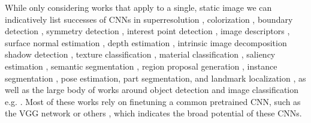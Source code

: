 \documentclass[10pt,twocolumn,letterpaper]{article}
\begin{document}
While only considering works that apply to a single, static image  we can indicatively list successes of CNNs in superresolution \cite{DongLHT16},  colorization \cite{LarssonMS16}, boundary detection \cite{shi15,ganin2014n,hed,iclr16},  symmetry detection \cite{ShenZJWZB16}, interest point detection \cite{eccv16lift}, image descriptors \cite{ZagoruykoK15,simo2015deepdesc,HanLJSB15}, 
surface normal estimation \cite{Eigen15,WangFG15,BansalRG16}, depth estimation \cite{Eigen15,LiuSL14,LiuSLR15}, intrinsic image decomposition \cite{NMY:ICCV:2015} shadow detection \cite{yago16},  texture classification \cite{CimpoiMKV16}, material classification \cite{BellUSB15}, saliency estimation \cite{ZhaoOLW15,saliencycvpr16},  semantic segmentation \cite{farabet2013learning,LongSD15,ChenPK0Y16}, region proposal generation \cite{RenHGS15,PinheiroCD15,GidarisK16}, instance segmentation \cite{hariharan2014simultaneous,PinheiroCD15,DaiHS15}, pose estimation, part segmentation, and landmark localization \cite{ZhangLLT14,ToshevS14,TsogkasSemanticPart15,ChenYWXY15,PfisterCZ15,NewellYD16,BelagiannisZ16,InsafutdinovPAA16,WeiRKS16}, as well as the large body of works around object detection and image classification e.g. \cite{KrizhevskyNIPS2013, SEZM+14, simonyan2014very, SzegedyLJSRAEVR14,girshick2014rcnn,RenHGS15,Girshick15,HeZRS15,DaiLHS16}. 
Most of these works rely on finetuning a common pretrained CNN, such as the VGG network \cite{simonyan2014very} or others \cite{KrizhevskyNIPS2013,HeZRS15}, which  indicates the broad potential of these CNNs.
\end{document}
